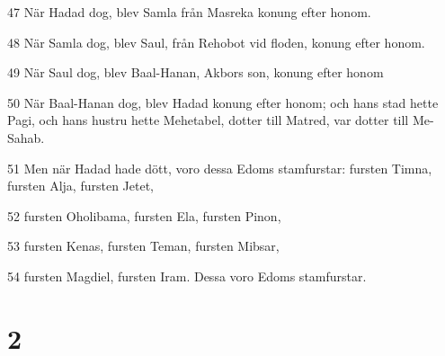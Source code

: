 \par 47 När Hadad dog, blev Samla från Masreka konung efter honom.
\par 48 När Samla dog, blev Saul, från Rehobot vid floden, konung efter honom.
\par 49 När Saul dog, blev Baal-Hanan, Akbors son, konung efter honom
\par 50 När Baal-Hanan dog, blev Hadad konung efter honom; och hans stad hette Pagi, och hans hustru hette Mehetabel, dotter till Matred, var dotter till Me-Sahab.
\par 51 Men när Hadad hade dött, voro dessa Edoms stamfurstar: fursten Timna, fursten Alja, fursten Jetet,
\par 52 fursten Oholibama, fursten Ela, fursten Pinon,
\par 53 fursten Kenas, fursten Teman, fursten Mibsar,
\par 54 fursten Magdiel, fursten Iram. Dessa voro Edoms stamfurstar.

\chapter{2}

